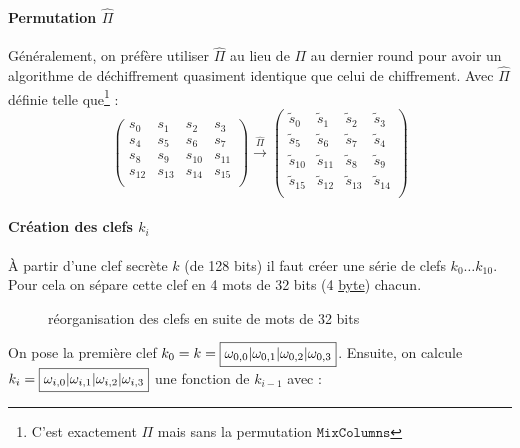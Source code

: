 \documentclass[a4paper, 12pt]{article}
\begin{document}
\paragraph{Permutation $\hat{\Pi}$}\label{permutPiChap}
Généralement, on préfère utiliser $\hat{\Pi}$ au lieu de \hyperref[permutPi]{$\Pi$}  au dernier round pour avoir un algorithme de déchiffrement quasiment identique que celui de chiffrement. Avec $\hat{\Pi}$ définie telle que\footnote{C'est exactement $\Pi$ mais sans la permutation $\mathtt{MixColumns}$} :
$$
\begin{pmatrix}
	s_{0} & s_{1} & s_{2} & s_{3} \\
	s_{4} & s_{5} & s_{6} & s_{7} \\
	s_{8} & s_{9} & s_{10} & s_{11} \\
	s_{12} & s_{13} & s_{14} & s_{15} \\
\end{pmatrix}
\overset{\hat{\Pi}}{\rightarrow}
\begin{pmatrix}
	\tilde{s}_0 & \tilde{s}_1 & \tilde{s}_2 & \tilde{s}_3 \\
	\tilde{s}_5 & \tilde{s}_6 & \tilde{s}_7 & \tilde{s}_4 \\
	\tilde{s}_{10} & \tilde{s}_{11} & \tilde{s}_8 & \tilde{s}_9 \\
	\tilde{s}_{15} & \tilde{s}_{12} & \tilde{s}_{13} & \tilde{s}_{14} \\
\end{pmatrix}
$$
 
\paragraph{Création des clefs $k_i$}\label{clefki}
À partir d'une clef secrète $k$ (de 128 bits) il faut créer une série de clefs $k_0\dots k_{10}$.
Pour cela on sépare cette clef en 4 mots de 32 bits (4 \hyperref[byte]{byte}) chacun.

\begin{figure}[h]
\centering
{}
\caption{réorganisation des clefs en suite de mots de 32 bits}
\label{illu_clef}
\end{figure}
\noindent On pose la première clef $k_0 = k = \fbox{$\omega_{0,0}|\omega_{0,1}|\omega_{0,2}|\omega_{0,3}$}$. Ensuite, on calcule $k_i = \fbox{$\omega_{i,0}|\omega_{i,1}|\omega_{i,2}|\omega_{i,3}$}$ une fonction de $k_{i-1}$ avec :
\end{document}
